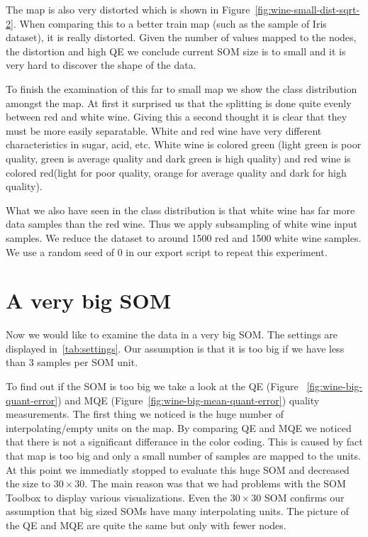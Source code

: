 \documentclass{acm_proc_article-sp}
\begin{document}
The map is also very distorted which is shown in Figure~\ref{fig:wine-small-dist-sqrt-2}.
When comparing this to a better train map (such as the sample of Iris dataset), it is
really distorted. Given the number of values mapped to the nodes, the distortion and
high QE we conclude current SOM size is to small and it is very hard to discover the shape of the data.

To finish the examination of this far to small map we show the class distribution amongst the map.
At first it surprised us that the splitting is done quite evenly between red and
white wine. Giving this a second thought it is clear that they must be more easily separatable.
White and red wine have very different characteristics in sugar, acid, etc. 
White wine is colored green (light green is poor quality, green is average quality and dark green is high quality) and
red wine is colored red(light for poor quality, orange for average quality and dark for high quality).

What we also have seen in the class distribution is that white wine has far more data samples
than the red wine. Thus we apply subsampling of white wine input samples.
We reduce the dataset to around 1500 red and 1500 white wine samples.
We use a random seed of 0 in our export script to repeat this experiment.

\section{A very big SOM}

Now we would like to examine the data in a very big SOM. The settings are displayed
in~\ref{tab:settings}. Our assumption is that it is too big if we have less than 3
samples per SOM unit.

To find out if the SOM is too big we take a look at the QE (Figure ~\ref{fig:wine-big-quant-error}) and MQE (Figure~\ref{fig:wine-big-mean-quant-error}) quality measurements.
The first thing we noticed is the huge number of interpolating/empty units on the map. By comparing QE and MQE we noticed that there is not
a significant differance in the color coding. This is caused by fact that map is too big and only a small number of samples
are mapped to the units.
At this point we immediatly stopped to evaluate this huge SOM and decreased the size to $30\times30$. The main reason was that we had problems
with the SOM Toolbox to display various visualizations. Even the $30\times30$ SOM confirms our assumption that big sized SOMs have
many interpolating units. The picture of the QE and MQE are quite the same but only with fewer nodes.
\end{document}
